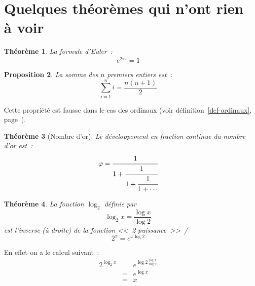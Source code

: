 \documentclass{article}
\newtheorem{theo}{Théorème}[section]    %
\newtheorem{prop}[theo]{Proposition}    %
\newcommand{\expo}[2]{#1^{#2}}
\begin{document}
\section{Quelques théorèmes qui n'ont rien à voir}

\begin{theo}
  La formule d'Euler~:
  \begin{equation}
    \expo e{2i\pi}=1 %
  \end{equation}
\end{theo}

\begin{prop}
  La somme des $n$ premiers entiers est~:
  \begin{displaymath}
    \sum_{i=1}^ni = \frac{n(n+1)}2
  \end{displaymath}
\end{prop}
Cette propriété est fausse dans le cas des ordinaux (voir
définition~\ref{def-ordinaux}, page~\pageref{def-ordinaux}).

\begin{theo}[Nombre d'or]
  Le développement en fraction continue du nombre d'or est~:
\begin{equation*} %
    \varphi = \cfrac 1{1+\cfrac 1{1 + \cfrac 1{1 + \dotsb}}}
  \end{equation*}
\end{theo}

\begin{theo}\label{theo-log2}
  La fonction $\log_2$ définie par
  \begin{displaymath}
    \log_2 x = \frac{\log x}{\log 2}
  \end{displaymath}
  est l'inverse (à droite) de la fonction <<~2 puissance~>>~/
  \begin{displaymath}
    2^x = e^{x\log 2}
  \end{displaymath}
\end{theo}

En effet on a le calcul suivant~:
\begin{eqnarray*}
 2^{\log_2 x} &=& e^{\log 2\frac{\log x}{\log 2}}\\
              &=& e^{\log x}\\
              &=& x
\end{eqnarray*}
\end{document}
